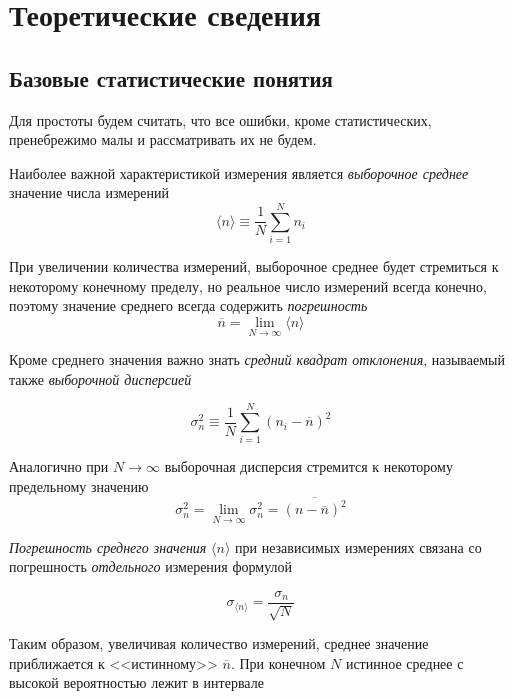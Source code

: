 \documentclass[a4paper, 12pt]{article}
\begin{document}
\section*{Теоретические сведения}
\subsection*{Базовые статистические понятия}
Для простоты будем считать, что все ошибки, кроме статистических, пренебрежимо малы и рассматривать их не будем.

Наиболее важной характеристикой измерения является \textit{выборочное среднее} значение числа измерений
\begin{equation}
\langle n \rangle \equiv \frac{1}{N}\sum_{i=1}^{N} {n_i}
\end{equation}

При увеличении количества измерений, выборочное среднее будет стремиться к некоторому конечному пределу, но реальное число измерений всегда конечно, поэтому значение среднего всегда содержить \textit{погрешность}
\begin{displaymath}
\overline{n} = \lim_{N\to\infty}\langle n \rangle
\end{displaymath}

Кроме среднего значения важно знать \textit{средний квадрат отклонения}, называемый также \textit{выборочной дисперсией}

\begin{equation}
\sigma_{n}^2 \equiv \frac{1}{N}\sum_{i=1}^N{(n_i-\overline{n})^2}
\end{equation}

Аналогично при \( N \to\infty\) выборочная дисперсия стремится к некоторому предельному значению
\begin{displaymath}
    \sigma_{n}^2 = \lim_{N\to\infty}\sigma_{n}^2 = \overline{(n - \overline{n})^2}
\end{displaymath}

\textit{Погрешность среднего значения} \(\langle n \rangle\) при независимых измерениях связана со погрешность \textit{отдельного} измерения формулой

\begin{equation}\label{pogr_sr}
    \sigma_{\langle n \rangle} = \frac{\sigma_{n}}{\sqrt{N}}
\end{equation}

Таким образом, увеличивая количество измерений, среднее значение приближается к <<истинному>> \(\overline{n}\). При конечном \(N\) истинное среднее с высокой вероятностью лежит в интервале
\end{document}
